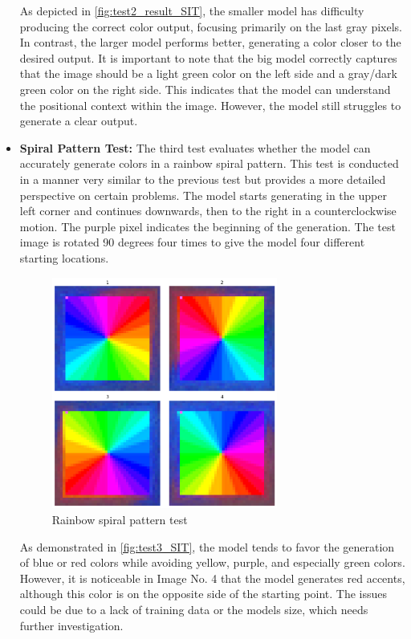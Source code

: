\begin{itemize}
        As depicted in \autoref{fig:test2_result_SIT}, the smaller model has difficulty producing the correct color output, focusing primarily on the last gray pixels. In contrast, the larger model performs better, generating a color closer to the desired output. It is important to note that the big model correctly captures that the image should be a light green color on the left side and a gray/dark green color on the right side. This indicates that the model can understand the positional context within the image. However, the model still struggles to generate a clear output.
        

        \item \textbf{Spiral Pattern Test:} The third test evaluates whether the model can accurately generate colors in a rainbow spiral pattern. This test is conducted in a manner very similar to the previous test but provides a more detailed perspective on certain problems. The model starts generating in the upper left corner and continues downwards, then to the right in a counterclockwise motion. The purple pixel indicates the beginning of the generation. The test image is rotated 90 degrees four times to give the model four different starting locations.

        \begin{figure}[H]
            \centering
            \includegraphics[width=0.7\textwidth]{imgs/RainbowImageTest_5.0.1.0_big.png}
            \caption{Rainbow spiral pattern test}
            \label{fig:test3_SIT}
        \end{figure}
        
        As demonstrated in \autoref{fig:test3_SIT}, the model tends to favor the generation of blue or red colors while avoiding yellow, purple, and especially green colors. However, it is noticeable in Image No. 4 that the model generates red accents, although this color is on the opposite side of the starting point. The issues could be due to a lack of training data or the models size, which needs further investigation.
        

    \end{itemize}

